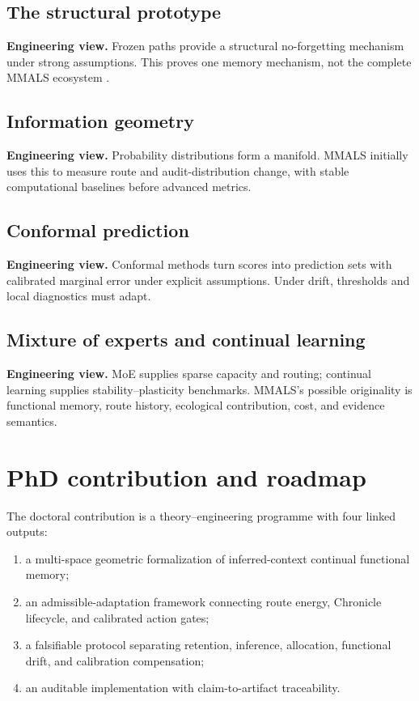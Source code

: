 \documentclass[11pt,a4paper]{article}
\begin{document}
\subsection{The structural prototype}
\textbf{Engineering view.} Frozen paths provide a structural no-forgetting mechanism under strong assumptions. This proves one memory mechanism, not the complete MMALS ecosystem \cite{mmalsprototype}.


\subsection{Information geometry}
\textbf{Engineering view.} Probability distributions form a manifold. MMALS initially uses this to measure route and audit-distribution change, with stable computational baselines before advanced metrics.


\subsection{Conformal prediction}
\textbf{Engineering view.} Conformal methods turn scores into prediction sets with calibrated marginal error under explicit assumptions. Under drift, thresholds and local diagnostics must adapt.


\subsection{Mixture of experts and continual learning}
\textbf{Engineering view.} MoE supplies sparse capacity and routing; continual learning supplies stability--plasticity benchmarks. MMALS's possible originality is functional memory, route history, ecological contribution, cost, and evidence semantics.


\section{PhD contribution and roadmap}
The doctoral contribution is a theory--engineering programme with four linked outputs:
\begin{enumerate}
\item a multi-space geometric formalization of inferred-context continual functional memory;
\item an admissible-adaptation framework connecting route energy, Chronicle lifecycle, and calibrated action gates;
\item a falsifiable protocol separating retention, inference, allocation, functional drift, and calibration compensation;
\item an auditable implementation with claim-to-artifact traceability.
\end{enumerate}
\end{document}
